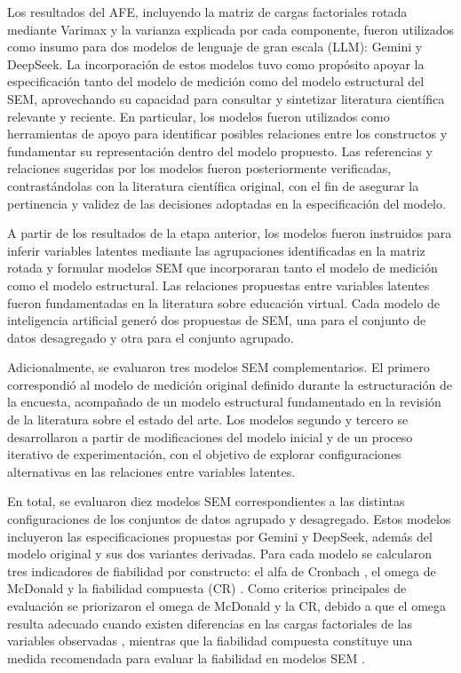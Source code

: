 \documentclass[conference]{IEEEtran}
\begin{document}
Los resultados del AFE, incluyendo la matriz de cargas factoriales rotada mediante Varimax y la varianza explicada por cada componente, fueron utilizados como insumo para dos modelos de lenguaje de gran escala (LLM): Gemini y DeepSeek. La incorporación de estos modelos tuvo como propósito apoyar la especificación tanto del modelo de medición como del modelo estructural del SEM, aprovechando su capacidad para consultar y sintetizar literatura científica relevante y reciente. En particular, los modelos fueron utilizados como herramientas de apoyo para identificar posibles relaciones entre los constructos y fundamentar su representación dentro del modelo propuesto. Las referencias y relaciones sugeridas por los modelos fueron posteriormente verificadas, contrastándolas con la literatura científica original, con el fin de asegurar la pertinencia y validez de las decisiones adoptadas en la especificación del modelo.

A partir de los resultados de la etapa anterior, los modelos fueron instruidos para inferir variables latentes mediante las agrupaciones identificadas en la matriz rotada y formular modelos SEM que incorporaran tanto el modelo de medición como el modelo estructural. Las relaciones propuestas entre variables latentes fueron fundamentadas en la literatura sobre educación virtual. Cada modelo de inteligencia artificial generó dos propuestas de SEM, una para el conjunto de datos desagregado y otra para el conjunto agrupado.

Adicionalmente, se evaluaron tres modelos SEM complementarios. El primero correspondió al modelo de medición original definido durante la estructuración de la encuesta, acompañado de un modelo estructural fundamentado en la revisión de la literatura sobre el estado del arte. Los modelos segundo y tercero se desarrollaron a partir de modificaciones del modelo inicial y de un proceso iterativo de experimentación, con el objetivo de explorar configuraciones alternativas en las relaciones entre variables latentes.

En total, se evaluaron diez modelos SEM correspondientes a las distintas configuraciones de los conjuntos de datos agrupado y desagregado. Estos modelos incluyeron las especificaciones propuestas por Gemini y DeepSeek, además del modelo original y sus dos variantes derivadas. Para cada modelo se calcularon tres indicadores de fiabilidad por constructo: el alfa de Cronbach \cite{Cronbach1951}, el omega de McDonald \cite{mcdonald1999test} y la fiabilidad compuesta (CR) \cite{FornellLarcker1981}. Como criterios principales de evaluación se priorizaron el omega de McDonald y la CR, debido a que el omega resulta adecuado cuando existen diferencias en las cargas factoriales de las variables observadas \cite{mcdonald1999test}, mientras que la fiabilidad compuesta constituye una medida recomendada para evaluar la fiabilidad en modelos SEM \cite{raykov1997estimation}.
\end{document}
